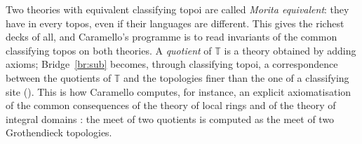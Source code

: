 
Two theories with equivalent classifying topoi are called \emph{Morita equivalent}: they have  in every topos, even if their languages are different. This gives the richest decks of all, and Caramello's programme is to read invariants of the common classifying topos on both theories. A \emph{quotient} of $\mathbb T$ is a theory obtained by adding axioms; Bridge~\ref{br:sub} becomes, through classifying topoi, a correspondence between the quotients of $\mathbb T$ and the topologies finer than the one of a classifying site \cite[ch.~3]{caramello-tst} (). This is how Caramello computes, for instance, an explicit axiomatisation of the common consequences of the theory of local rings and of the theory of integral domains \cite[\S18]{caramello-lattices}: the meet of two quotients is computed as the meet of two Grothendieck topologies.
